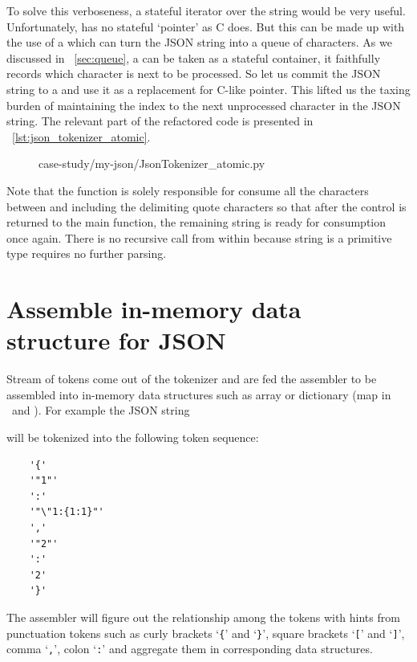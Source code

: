 To solve this verboseness, a stateful iterator over the string would be very useful.
Unfortunately, \python has no stateful `pointer' as C does.
But this can be made up with the use of a  which can turn the JSON string into a
queue of characters.
As we discussed in ~\autoref{sec:queue}, a  can be taken as a stateful container,
it faithfully records which character is next to be processed.
So let us commit the JSON string to a  and use it as a replacement for C-like pointer.
This lifted us the taxing burden of maintaining the index to the next unprocessed character
in the JSON string.
The relevant part of the refactored code is presented in ~\autoref{lst:json_tokenizer_atomic}.

\begin{figure}[H]
    
    {case-study/my-json/JsonTokenizer_atomic.py}
\end{figure}

Note that the function  is solely responsible for consume all the characters
between and including the delimiting quote characters so that after the control is returned to
the main function, the remaining string is ready for consumption once again.
There is no recursive call from within  because string is a primitive type
requires no further parsing.

\section{Assemble in-memory data structure for JSON}\label{sec:JsonAssembler}

Stream of tokens come out of the tokenizer and are fed the assembler
to be assembled into in-memory data structures such as array or dictionary
(map in \java ~and \cpp).
For example the JSON string
\begin{quote}
\end{quote}
will be tokenized into the following token sequence:
\begin{lstlisting}
    '{'
    '"1"'
    ':'
    '"\"1:{1:1}"'
    ','
    '"2"'
    ':'
    '2'
    '}'
\end{lstlisting}
The assembler will figure out the
relationship among the tokens with hints from punctuation tokens such as
curly brackets `\texttt{\{}' and `\texttt{\}}',
square brackets `\texttt{[}' and `\texttt{]}',
comma `\texttt{,}', colon `\texttt{:}'
and aggregate them in corresponding data structures.

